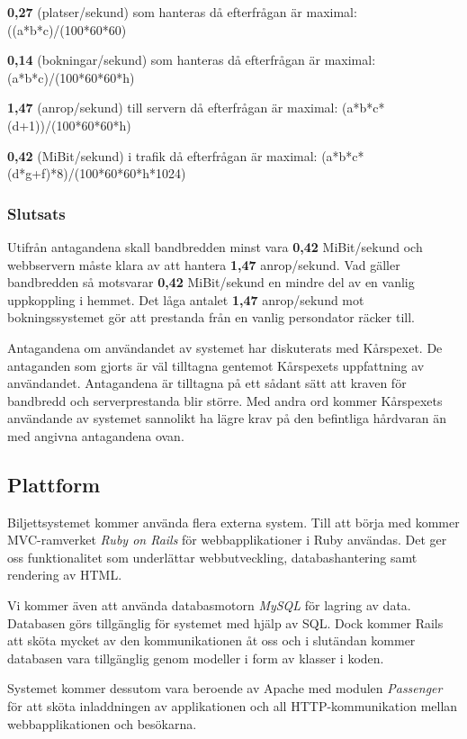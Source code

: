\documentclass[a4paper, twoside, 11pt, titlepage]{article}
\begin{document}
		\textbf{0,27} (platser/sekund) som hanteras då efterfrågan är maximal: ((a*b*c)/(100*60*60)

		\textbf{0,14} (bokningar/sekund) som hanteras då efterfrågan är maximal: (a*b*c)/(100*60*60*h)

		\textbf{1,47} (anrop/sekund) till servern då efterfrågan är maximal: (a*b*c*(d+1))/(100*60*60*h)

		\textbf{0,42} (MiBit/sekund) i trafik då efterfrågan är maximal: (a*b*c*(d*g+f)*8)/(100*60*60*h*1024)

		\subsubsection{Slutsats}


		Utifrån antagandena skall bandbredden minst vara \textbf{0,42} MiBit/sekund och webbservern måste klara av att hantera \textbf{1,47} anrop/sekund. Vad gäller bandbredden så motsvarar \textbf{0,42} MiBit/sekund en mindre del av en vanlig uppkoppling i hemmet. Det låga antalet \textbf{1,47} anrop/sekund mot bokningssystemet gör att prestanda från en vanlig persondator räcker till.

		Antagandena om användandet av systemet har diskuterats med Kårspexet. De antaganden som gjorts är väl tilltagna gentemot Kårspexets uppfattning av användandet. Antagandena är tilltagna på ett sådant sätt att kraven för bandbredd och serverprestanda blir större. Med andra ord kommer Kårspexets användande av systemet sannolikt ha lägre krav på den befintliga hårdvaran än med angivna antagandena ovan.

	\subsection{Plattform}


	Biljettsystemet kommer använda flera externa system. Till att börja med kommer MVC-ramverket \emph{Ruby on Rails} för webbapplikationer i Ruby användas. Det ger oss funktionalitet som underlättar webbutveckling, databashantering samt rendering av HTML.

	Vi kommer även att använda databasmotorn \emph{MySQL} för lagring av data. Databasen görs tillgänglig för systemet med hjälp av SQL. Dock kommer Rails att sköta mycket av den kommunikationen åt oss och i slutändan kommer databasen vara tillgänglig genom modeller i form av klasser i koden. 

	Systemet kommer dessutom vara beroende av Apache med modulen \emph{Passenger} för att sköta inladdningen av applikationen och all HTTP-kommunikation mellan webbapplikationen och besökarna.
\end{document}
